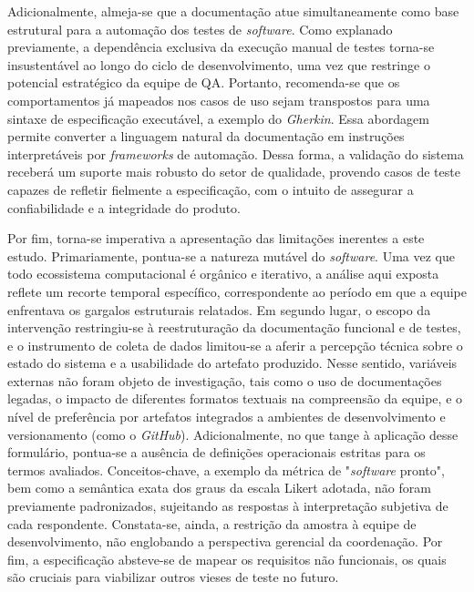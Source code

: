 Adicionalmente, almeja-se que a documentação atue simultaneamente como base estrutural para a automação dos testes de \textit{software}. Como explanado previamente, a dependência exclusiva da execução manual de testes torna-se insustentável ao longo do ciclo de desenvolvimento, uma vez que restringe o potencial estratégico da equipe de QA. Portanto, recomenda-se que os comportamentos já mapeados nos casos de uso sejam transpostos para uma sintaxe de especificação executável, a exemplo do \textit{Gherkin}. Essa abordagem permite converter a linguagem natural da documentação em instruções interpretáveis por \textit{frameworks} de automação. Dessa forma, a validação do sistema receberá um suporte mais robusto do setor de qualidade, provendo casos de teste capazes de refletir fielmente a especificação, com o intuito de assegurar a confiabilidade e a integridade do produto.

Por fim, torna-se imperativa a apresentação das limitações inerentes a este estudo. Primariamente, pontua-se a natureza mutável do \textit{software}. Uma vez que todo ecossistema computacional é orgânico e iterativo, a análise aqui exposta reflete um recorte temporal específico, correspondente ao período em que a equipe enfrentava os gargalos estruturais relatados. Em segundo lugar, o escopo da intervenção restringiu-se à reestruturação da documentação funcional e de testes, e o instrumento de coleta de dados limitou-se a aferir a percepção técnica sobre o estado do sistema e a usabilidade do artefato produzido. Nesse sentido, variáveis externas não foram objeto de investigação, tais como o uso de documentações legadas, o impacto de diferentes formatos textuais na compreensão da equipe, e o nível de preferência por artefatos integrados a ambientes de desenvolvimento e versionamento (como o \textit{GitHub}). Adicionalmente, no que tange à aplicação desse formulário, pontua-se a ausência de definições operacionais estritas para os termos avaliados. Conceitos-chave, a exemplo da métrica de "\textit{software} pronto", bem como a semântica exata dos graus da escala Likert adotada, não foram previamente padronizados, sujeitando as respostas à interpretação subjetiva de cada respondente. Constata-se, ainda, a restrição da amostra à equipe de desenvolvimento, não englobando a perspectiva gerencial da coordenação. Por fim, a especificação absteve-se de mapear os requisitos não funcionais, os quais são cruciais para viabilizar outros vieses de teste no futuro.

